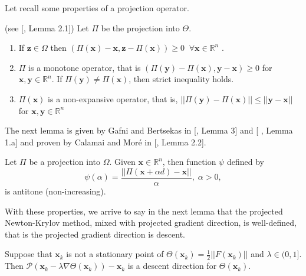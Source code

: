 Let recall some properties of a projection operator. 
\begin{lem}{(see [\cite{Calamai}, Lemma 2.1])}
	\label{lemma_grad}
	Let $\varPi$ be the projection into $ \Theta  $.
	
	\begin{enumerate}[label=(\alph*)]
		\label{propertiesP}
		\item If $ \textbf{z} \in \Omega $ then $ (\varPi (\textbf{x}) - \textbf{x}, \textbf{z} - \varPi(\textbf{x}))\geq0 \; \; \forall \textbf{x} \in \mathbb{R}^n$ . 
		\item $ \varPi$ is a monotone operator, that is $(\varPi(\textbf{y}) - \varPi(\textbf{x}), \textbf{y} -\textbf{x})\geq 0  $ for $ \textbf{x}, \textbf{y} \in \mathbb{R}^n $. If $ \varPi(\textbf{y}) \neq\varPi(\textbf{x}) $, then strict inequality holds. 
		\item $ \varPi(\textbf{x}) $ is a non-expansive operator, that is, $||\varPi(\textbf{y}) - \varPi(\textbf{x})||\leq ||\textbf{y}-\textbf{x}|| $ for $ \textbf{x}, \textbf{y} \in \mathbb{R}^n$ 
	\end{enumerate}
\end{lem}
The next lemma is given by Gafni and Bertsekas in [\cite{Gafni}, Lemma 3] and [ \cite{Gafni2}, Lemma 1.a] and proven by Calamai and Mor\'e in [\cite{Calamai}, Lemma 2.2].
\begin{lem}
	\label{lem2paper}
	Let $ \varPi $ be a projection into $\Omega  $. Given $\textbf{x} \in \mathbb{R}^n $, then function $\psi  $ defined by 
	\begin{equation}
	\psi (\alpha) = \frac{||\varPi(\textbf{x} + \alpha d) - \textbf{x}||}{\alpha}, \; \alpha >0,
	\end{equation} 
	is antitone (non-increasing).
\end{lem}
With these properties, we arrive to say in the next lemma that the projected Newton-Krylov method, mixed with projected gradient direction, is well-defined, that is the projected gradient direction is descent.
\begin{lem}
	\label{lem_descent}
	Suppose that $ \textbf{x}_k $ is not a stationary point of $ \Theta(\textbf{x}_k) = \frac{1}{2}||F(\textbf{x}_k)||$ and $ \lambda \in (0,1] $. Then $ \mathcal{P}(\textbf{x}_k - \lambda \nabla \Theta (\textbf{x}_k)) - \textbf{x}_k $ is a descent direction for $ \Theta(\textbf{x}_k) $.
\end{lem}
